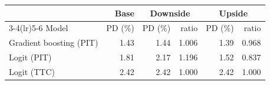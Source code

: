 \begin{tabular}{lrrrrr}
\toprule
& Base & \multicolumn{2}{c}{Downside} & \multicolumn{2}{c}{Upside} \\
\cmidrule(lr){3-4}\cmidrule(lr){5-6}
Model & PD (\%) & PD (\%) & ratio & PD (\%) & ratio \\
\midrule
Gradient boosting (PIT) & 1.43 & 1.44 & 1.006 & 1.39 & 0.968 \\
Logit (PIT) & 1.81 & 2.17 & 1.196 & 1.52 & 0.837 \\
Logit (TTC) & 2.42 & 2.42 & 1.000 & 2.42 & 1.000 \\
\bottomrule
\end{tabular}
